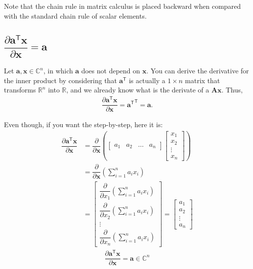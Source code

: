 \documentclass{article}
\newcommand{\trans}{\mathsf{T}}
\begin{document}
Note that the chain rule in matrix calculus is placed backward when compared with the standard chain rule of scalar elements.

\subsection{\(\dfrac{\partial \mathbf{a}^\trans \mathbf{x}}{\partial \mathbf{x}} = \mathbf{a}\)}

Let \(\mathbf{a, x} \in \mathbb{C}^{n}\), in which \(\mathbf{a}\) does not depend on \(\mathbf{x}\). You can derive the derivative for the inner product by considering that \(\mathbf{a}^\trans\) is actually a \(1\times n\) matrix that transforms \(\mathbb{R}^{n}\) into \(\mathbb{R}\), and we already know what is the derivate of a \(\mathbf{Ax}\). Thus,
\begin{align}
    \dfrac{\partial \mathbf{a}^\trans \mathbf{x}}{\partial \mathbf{x}} = {\mathbf{a}^\trans}^\trans = \mathbf{a}.
\end{align}

Even though, if you want the step-by-step, here it is:
\begin{align}
    \dfrac{\partial \mathbf{a}^\trans \mathbf{x}}{\partial \mathbf{x}} &= \dfrac{\partial}{\partial \mathbf{x}} \left(
    \begin{bmatrix}
        a_1 & a_2 & \dots & a_n
    \end{bmatrix} \begin{bmatrix}
        x_{1} \\ x_{2} \\ \vdots \\ x_{n}
    \end{bmatrix} \right) \\
    & = \dfrac{\partial}{\partial \mathbf{x}} \left( \sum_{i = 1}^n a_ix_i \right) \\
    & = \begin{bmatrix}
        \dfrac{\partial}{\partial x_1} \left( \sum_{i = 1}^n a_ix_i \right) \\ \dfrac{\partial}{\partial x_2} \left( \sum_{i = 1}^n a_ix_i \right) \\ \vdots \\ \dfrac{\partial}{\partial x_n} \left( \sum_{i = 1}^n a_ix_i \right) 
    \end{bmatrix} = \begin{bmatrix}
        a_1 \\ a_2 \\ \vdots \\ a_n
    \end{bmatrix}
\end{align}
\begin{align}
    \boxed{\dfrac{\partial \mathbf{a}^\trans \mathbf{x}}{\partial \mathbf{x}} = \mathbf{a} \in \mathbb{C}^{n}}
\end{align}
\end{document}
